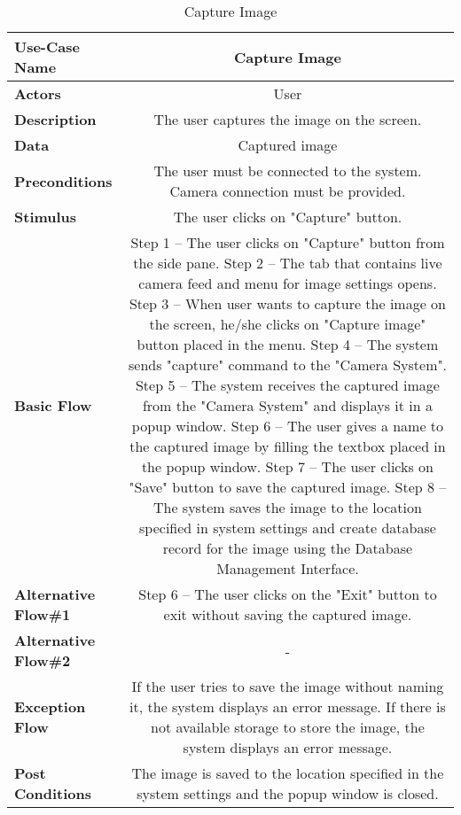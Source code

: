 \begin{table}[H]
     \centering
     \begin{tabular}{|l|C|}
         \hline
          \textbf{Use-Case Name} & Capture Image \\
         \hline
          \textbf{Actors} & User \\ 
         \hline
          \textbf{Description} & The user captures the image on the screen. \\ 
         \hline
          \textbf{Data} & Captured image\\ 
         \hline
          \textbf{Preconditions} & 
          The user must be connected to the system. \newline
          Camera connection must be provided. \\
         \hline
          \textbf{Stimulus} & The user clicks on "Capture" button.\\ 
         \hline
          \textbf{Basic Flow} & 
          Step 1 -- The user clicks on "Capture" button from the side pane. \newline
          Step 2 -- The tab that contains live camera feed and menu for image settings opens. \newline
          Step 3 -- When user wants to capture the image on the screen, he/she clicks on "Capture image" button placed in the menu. \newline
          Step 4 -- The system sends "capture" command to the "Camera System". \newline
          Step 5 -- The system receives the captured image from the "Camera System" and displays it in a popup window. \newline
          Step 6 -- The user gives a name to the captured image by filling the textbox placed in the popup window. \newline
		  Step 7 -- The user clicks on "Save" button to save the captured image. \newline
		  Step 8 -- The system saves the image to the location specified in system settings and create database record for the image using the Database Management Interface. \\
         \hline
          \textbf{Alternative Flow\#1} & 
          Step 6 -- The user clicks on the "Exit" button to exit without saving the captured image. \\
         \hline
          \textbf{Alternative Flow\#2} & - \\
         \hline
          \textbf{Exception Flow} & If the user tries to save the image without naming it, the system displays an error message. If there is not available storage to store the image, the system displays an error message.\\
         \hline
          \textbf{Post Conditions} & The image is saved to the location specified in the system settings and the popup window is closed. \\ 
         \hline
     \end{tabular}
     \caption{Capture Image}
     \label{tab:capture_image}
 \end{table}